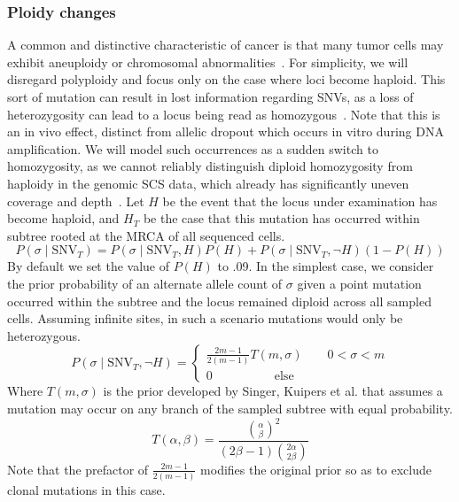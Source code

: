 \documentclass[../../main.tex]{subfiles}
\begin{document}
\subsubsection*{Ploidy changes}
A common and distinctive characteristic of cancer is that many tumor cells may exhibit aneuploidy or chromosomal abnormalities~\cite{gao2016punctuated, 21breasts, aneuploidy, merlo2006cancer, onecelltime}.
For simplicity, we will disregard polyploidy and focus only on the case where loci become haploid.
This sort of mutation can result in lost information regarding SNVs, as a loss of heterozygosity can lead to a locus being read as homozygous~\cite{sciphi}.
Note that this is an in vivo effect, distinct from allelic dropout which occurs in vitro during DNA amplification.
We will model such occurrences as a sudden switch to homozygosity, as we cannot reliably distinguish diploid homozygosity from haploidy in the genomic SCS data, which already has significantly uneven coverage and depth~\cite{monovar, scprimer}.
Let $H$ be the event that the locus under examination has become haploid, and $H_T$ be the case that this mutation has occurred within subtree rooted at the MRCA of all sequenced cells.
\begin{equation}
P(\sigma \mid \text{SNV}_T) = P(\sigma\mid\text{SNV}_T,H)P(H) + P(\sigma\mid\text{SNV}_T,\neg H)(1-P(H)) 
\end{equation}
By default we set the value of $P(H)$ to .09. In the simplest case, we consider the prior probability of an alternate allele count of $\sigma$ given a point mutation occurred within the subtree and the locus remained diploid across all sampled cells.
Assuming infinite sites, in such a scenario mutations would only be heterozygous.
\begin{equation*}
P(\sigma\mid\text{SNV}_T,\neg H) = \begin{cases} \frac{2m-1}{2(m-1)} T(m,\sigma) \qquad 0<\sigma< m\\ 0 \qquad \qquad \quad \text{else}\end{cases}
\end{equation*}
Where $T(m,\sigma)$ is the prior developed by Singer, Kuipers et al. that assumes a mutation may occur on any branch of the sampled subtree with equal probability.
\begin{equation}\label{eq:T}
T(\alpha,\beta)=\frac{\binom{\alpha}{\beta}^2}{(2\beta-1)\binom{2\alpha}{2\beta}}
\end{equation}
Note that the prefactor of $\frac{2m-1}{2(m-1)}$ modifies the original prior so as to exclude clonal mutations in this case.
\end{document}
